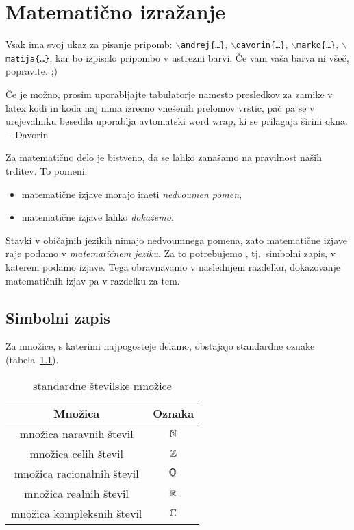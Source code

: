 \chapter{Matematično izražanje}\label{POGLAVJE: Matematično izražanje}

	\alert{Vsak ima svoj ukaz za pisanje pripomb: \textcolor{andrejcolor}{\texttt{$\backslash$andrej\{\ldots\}}}, \textcolor{davorincolor}{\texttt{$\backslash$davorin\{\ldots\}}}, \textcolor{markocolor}{\texttt{$\backslash$marko\{\ldots\}}}, \textcolor{matijacolor}{\texttt{$\backslash$matija\{\ldots\}}}, kar bo izpisalo pripombo v ustrezni barvi. Če vam vaša barva ni všeč, popravite. ;)}
	
	
	\alert{Če je možno, prosim uporabljajte tabulatorje namesto presledkov za zamike v latex kodi in koda naj nima izrecno vnešenih prelomov vrstic, pač pa se v urejevalniku besedila uporablja avtomatski word wrap, ki se prilagaja širini okna. \ --Davorin}
	
	Za matematično delo je bistveno, da se lahko zanašamo na pravilnost naših trditev. To pomeni:
	\begin{itemize}
		\item
			matematične izjave morajo imeti \emph{nedvoumen pomen},
		\item
			matematične izjave lahko \emph{dokažemo}.
	\end{itemize}
	
	Stavki v običajnih jezikih nimajo nedvoumnega pomena, zato matematične izjave raje podamo v \emph{matematičnem jeziku}. Za to potrebujemo , tj.~simbolni zapis, v katerem podamo izjave. Tega obravnavamo v naslednjem razdelku, dokazovanje matematičnih izjav pa v razdelku za tem.
	
	\section{Simbolni zapis}\label{RAZDELEK: Simbolni zapis}
	
		Za množice, s katerimi najpogosteje delamo, obstajajo standardne oznake (tabela~\ref{TABELA: standardne številske množice}).
		
		\begin{table}[!ht]
			\centering
			\begin{tabular}{|cc|}
				\hline
				\textbf{Množica} & \textbf{Oznaka} \\
				\hline
				množica naravnih števil & $\mathbb{N}$ \\
				množica celih števil & $\mathbb{Z}$ \\
				množica racionalnih števil & $\mathbb{Q}$ \\
				množica realnih števil & $\mathbb{R}$ \\
				množica kompleksnih števil & $\mathbb{C}$ \\
				\hline
			\end{tabular}
			\caption{standardne številske množice}\label{TABELA: standardne številske množice}
		\end{table}
		
